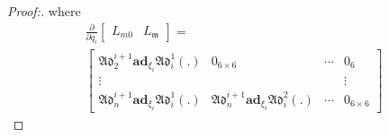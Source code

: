 \documentclass[lettersize,journal]{IEEEtran}
\def \Add {\mathfrak{Ad}}
\theoremstyle{remark}
\begin{document}
\begin{proof}[Proof:]
where
\begin{multline} \frac{\partial }{\partial q_i}\begin{bmatrix}L_{m0}&L_\mathfrak{m}\end{bmatrix}=\\
\begin{bmatrix}\Add_2^{i+1}\textbf{ad}_{\xi_i}\Add_i^1(.) &0_{6\times6}&\cdots&0_6\\\vdots & & &\vdots\\\Add_n^{i+1}\textbf{ad}_{\xi_i}\Add_i^1(.) &\Add_n^{i+1}\textbf{ad}_{\xi_i}\Add_i^2(.)&\cdots&0_{6\times6} \end{bmatrix}
\end{multline}

\end{proof}
\end{document}
